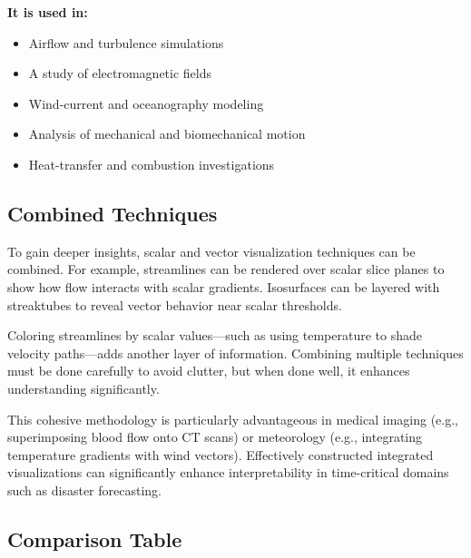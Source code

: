 \documentclass[11pt]{article}
\begin{document}
\vspace{0.5em}
\noindent
\textbf{It is used in:}
\begin{itemize}
	\item Airflow and turbulence simulations
	\item A study of electromagnetic fields
	\item Wind-current and oceanography modeling
	\item Analysis of mechanical and biomechanical motion
	\item Heat-transfer and combustion investigations
\end{itemize}

\subsection{Combined Techniques}
To gain deeper insights, scalar and vector visualization techniques can be combined. For example, streamlines can be rendered over scalar slice planes to show how flow interacts with scalar gradients. Isosurfaces can be layered with streaktubes to reveal vector behavior near scalar thresholds.
	
Coloring streamlines by scalar values—such as using temperature to shade velocity paths—adds another layer of information. Combining multiple techniques must be done carefully to avoid clutter, but when done well, it enhances understanding significantly.

This cohesive methodology is particularly advantageous in medical imaging (e.g., superimposing blood flow onto CT scans) or meteorology (e.g., integrating temperature gradients with wind vectors). Effectively constructed integrated visualizations can significantly enhance interpretability in time-critical domains such as disaster forecasting.
	
\subsection{Comparison Table}
	
\end{document}

